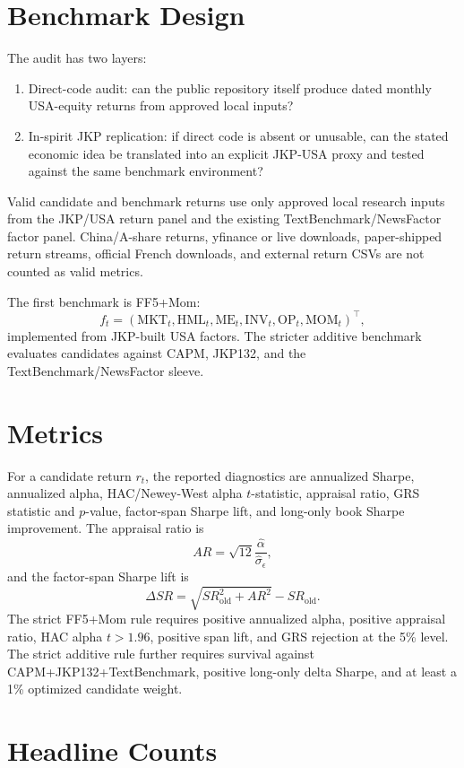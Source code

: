 \documentclass[11pt]{article}
\begin{document}
\section{Benchmark Design}

The audit has two layers:
\begin{enumerate}
  \item Direct-code audit: can the public repository itself produce dated monthly
  USA-equity returns from approved local inputs?
  \item In-spirit JKP replication: if direct code is absent or unusable, can the
  stated economic idea be translated into an explicit JKP-USA proxy and tested
  against the same benchmark environment?
\end{enumerate}

Valid candidate and benchmark returns use only approved local research inputs
from the JKP/USA return panel and the existing TextBenchmark/NewsFactor factor
panel. China/A-share returns, yfinance or live downloads, paper-shipped return
streams, official French downloads, and external return CSVs are not counted as
valid metrics.

The first benchmark is FF5+Mom:
\[
  f_t =
  (\mathrm{MKT}_t,\mathrm{HML}_t,\mathrm{ME}_t,\mathrm{INV}_t,
  \mathrm{OP}_t,\mathrm{MOM}_t)^\top,
\]
implemented from JKP-built USA factors. The stricter additive benchmark evaluates
candidates against CAPM, JKP132, and the TextBenchmark/NewsFactor sleeve.

\section{Metrics}

For a candidate return \(r_t\), the reported diagnostics are annualized Sharpe,
annualized alpha, HAC/Newey-West alpha \(t\)-statistic, appraisal ratio, GRS
statistic and \(p\)-value, factor-span Sharpe lift, and long-only book Sharpe
improvement. The appraisal ratio is
\[
  AR=\sqrt{12}\frac{\widehat{\alpha}}{\widehat{\sigma}_{\epsilon}},
\]
and the factor-span Sharpe lift is
\[
  \Delta SR = \sqrt{SR_{\mathrm{old}}^2 + AR^2} - SR_{\mathrm{old}}.
\]
The strict FF5+Mom rule requires positive annualized alpha, positive appraisal
ratio, HAC alpha \(t>1.96\), positive span lift, and GRS rejection at the 5\%
level. The strict additive rule further requires survival against
CAPM+JKP132+TextBenchmark, positive long-only delta Sharpe, and at least a 1\%
optimized candidate weight.

\section{Headline Counts}
\end{document}
